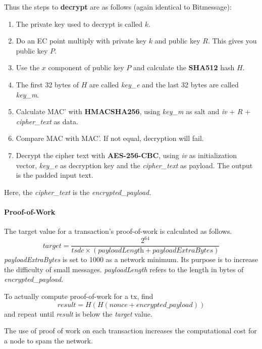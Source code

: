 \documentclass{article}
\begin{document}
Thus the steps to \textbf{decrypt} are as follows (again identical to Bitmessage):
\begin{enumerate}
    \item The private key used to decrypt is called $k$.
    \item Do an EC point multiply with private key $k$ and public key $R$. This gives you public key $P$.
    \item Use the $x$ component of public key $P$ and calculate the \textbf{SHA512} hash $H$.
    \item The first 32 bytes of $H$ are called \textit{key\_e} and the last 32 bytes are called \textit{key\_m}.
    \item Calculate MAC' with \textbf{HMACSHA256}, using \textit{key\_m} as salt and \textit{iv} + $R$ + \textit{cipher\_text} as data.
    \item Compare MAC with MAC'. If not equal, decryption will fail.
    \item Decrypt the cipher text with \textbf{AES-256-CBC}, using \textit{iv} as initialization vector, \textit{key\_e} as decryption key and the \textit{cipher\_text} as payload. The output is the padded input text.
\end{enumerate}

Here, the \textit{cipher\_text} is the \textit{encrypted\_payload}.

\paragraph{Proof-of-Work}
The target value for a transaction's proof-of-work is calculated as follows.
\[\textit{target} = \dfrac{2^{64}}{\textit{tsdc} \times \left(\textit{payloadLength} + \textit{payloadExtraBytes}\right)}\]
\textit{payloadExtraBytes} is set to 1000 as a network minimum. Its purpose is to increase the difficulty of small messages. \textit{payloadLength} refers to the length in bytes of \textit{encrypted\_payload}.

To actually compute proof-of-work for a tx, find \[\textit{result} = H(H(\textit{nonce} + \textit{encrypted\_payload}))\] and repeat until \textit{result} is below the \textit{target} value.

The use of proof of work on each transaction increases the computational cost for a node to spam the network.
\end{document}
